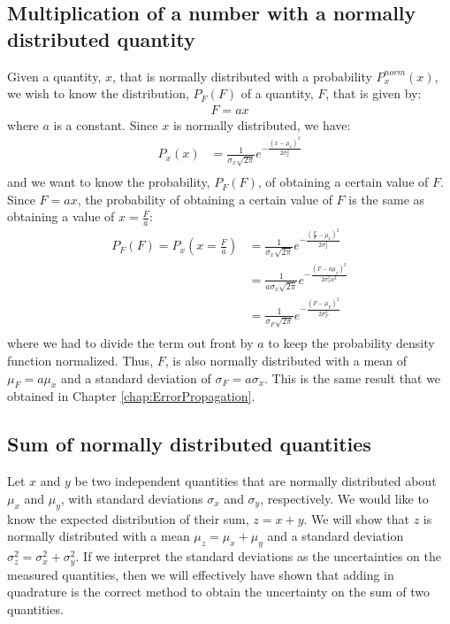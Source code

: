 \subsection{Multiplication of a number with a normally distributed quantity}
Given a quantity, $x$, that is normally distributed with a probability $P^{norm}_x(x)$, we wish to know the distribution, $P_F(F)$ of a quantity, $F$, that is given by:
\begin{align*}
F=ax
\end{align*}
where $a$ is a constant. Since $x$ is normally distributed, we have:
\begin{align*}
P_x(x)&=\frac{1}{\sigma_x\sqrt{2\pi}}e^{-\frac{(x-\mu_x)^2}{2\sigma_x^2}}\\
\end{align*}
and we want to know the probability, $P_F(F)$, of obtaining a certain value of $F$. Since $F=ax$, the probability of obtaining a certain value of $F$ is the same as obtaining a value of $x=\frac{F}{a}$:
\begin{align*}
P_F(F)=P_x(x=\frac{F}{a})&=\frac{1}{\sigma_x\sqrt{2\pi}}e^{-\frac{(\frac{F}{a}-\mu_x)^2}{2\sigma_x^2}}\\
&=\frac{1}{a\sigma_x\sqrt{2\pi}}e^{-\frac{(F-a\mu_x)^2}{2\sigma_x^2a^2}}\\
&=\frac{1}{\sigma_F\sqrt{2\pi}}e^{-\frac{(F-\mu_F)^2}{2\sigma_F^2}}\\
\end{align*}
where we had to divide the term out front by $a$ to keep the probability density function normalized. Thus, $F$, is also normally distributed with a mean of $\mu_F=a\mu_x$ and a standard deviation of $\sigma_F=a\sigma_x$. This is the same result that we obtained in Chapter \ref{chap:ErrorPropagation}. 

\subsection{Sum of normally distributed quantities}
Let $x$ and $y$ be two independent quantities that are normally distributed about $\mu_x$ and $\mu_y$, with standard deviations $\sigma_x$ and $\sigma_y$, respectively. We would like to know the expected distribution of their sum, $z=x+y$. We will show that $z$ is normally distributed with a mean $\mu_z=\mu_x+\mu_y$ and a standard deviation $\sigma_z^2=\sigma_x^2+\sigma_y^2$. If we interpret the standard deviations as the uncertainties on the measured quantities, then we will effectively have shown that adding in quadrature is the correct method to obtain the uncertainty on the sum of two quantities.

